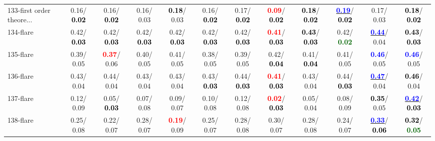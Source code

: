 \begin{table}[h]
\begin{center}
{\begin{tabular}{lc|c|c|c|c|c|c|c|c|c|c}
133-first order theore... &   0.16/\textcolor{black}{\textbf{  0.02}} &   0.16/\textcolor{black}{\textbf{  0.02}} &   0.16/  0.03 & \textcolor{black}{\textbf{  0.18}}/  0.03 &   0.16/\textcolor{black}{\textbf{  0.02}} &   0.17/\textcolor{black}{\textbf{  0.02}} & \textcolor{red}{\textbf{  0.09}}/\textcolor{black}{\textbf{  0.02}} & \textcolor{black}{\textbf{  0.18}}/\textcolor{black}{\textbf{  0.02}} & \underline{\textcolor{blue}{\textbf{  0.19}}}/\textcolor{black}{\textbf{  0.02}} &   0.17/  0.03 & \textcolor{black}{\textbf{  0.18}}/\textcolor{black}{\textbf{  0.02}} \\
134-flare &   0.42/\textcolor{black}{\textbf{  0.03}} &   0.42/\textcolor{black}{\textbf{  0.03}} &   0.42/\textcolor{black}{\textbf{  0.03}} &   0.42/\textcolor{black}{\textbf{  0.03}} &   0.42/\textcolor{black}{\textbf{  0.03}} &   0.42/\textcolor{black}{\textbf{  0.03}} & \textcolor{red}{\textbf{  0.41}}/\textcolor{black}{\textbf{  0.03}} & \textcolor{black}{\textbf{  0.43}}/\textcolor{black}{\textbf{  0.03}} &   0.42/\textcolor{darkgreen}{\textbf{  0.02}} & \underline{\textcolor{blue}{\textbf{  0.44}}}/  0.04 & \textcolor{black}{\textbf{  0.43}}/\textcolor{black}{\textbf{  0.03}} \\
135-flare &   0.39/  0.05 & \textcolor{red}{\textbf{  0.37}}/  0.06 &   0.40/  0.05 &   0.41/  0.05 &   0.38/  0.05 &   0.39/  0.05 &   0.42/\textcolor{black}{\textbf{  0.04}} &   0.41/\textcolor{black}{\textbf{  0.04}} &   0.41/  0.05 & \textcolor{blue}{\textbf{  0.46}}/  0.05 & \textcolor{blue}{\textbf{  0.46}}/  0.05 \\ \hline
136-flare &   0.43/  0.04 &   0.44/  0.04 &   0.43/  0.04 &   0.43/  0.04 &   0.43/\textcolor{black}{\textbf{  0.03}} &   0.44/\textcolor{black}{\textbf{  0.03}} & \textcolor{red}{\textbf{  0.41}}/\textcolor{black}{\textbf{  0.03}} &   0.43/  0.04 &   0.44/\textcolor{black}{\textbf{  0.03}} & \underline{\textcolor{blue}{\textbf{  0.47}}}/  0.04 & \textcolor{black}{\textbf{  0.46}}/  0.04 \\
137-flare &   0.12/  0.09 &   0.05/\textcolor{black}{\textbf{  0.03}} &   0.07/  0.08 &   0.09/  0.07 &   0.10/  0.08 &   0.12/  0.08 & \textcolor{red}{\textbf{  0.02}}/\textcolor{black}{\textbf{  0.03}} &   0.05/  0.04 &   0.08/  0.09 & \textcolor{black}{\textbf{  0.35}}/  0.05 & \underline{\textcolor{blue}{\textbf{  0.42}}}/\textcolor{black}{\textbf{  0.03}} \\
138-flare &   0.25/  0.08 &   0.22/  0.07 &   0.28/  0.07 & \textcolor{red}{\textbf{  0.19}}/  0.09 &   0.25/  0.07 &   0.28/  0.08 &   0.30/  0.07 &   0.28/  0.08 &   0.24/  0.07 & \underline{\textcolor{blue}{\textbf{  0.33}}}/\textcolor{black}{\textbf{  0.06}} & \textcolor{black}{\textbf{  0.32}}/\textcolor{darkgreen}{\textbf{  0.05}} \\

\end{tabular}}
\end{center}
\end{table}
